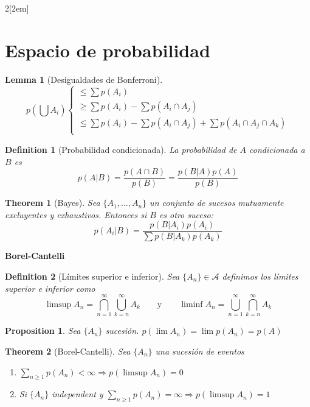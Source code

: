 \documentclass{myclass}
\newtheorem*{theorem}{Theorem}
\newtheorem*{lemma}{Lemma}
\newtheorem*{proposition}{Proposition}
\newtheorem*{definition}{Definition}
\begin{document}
\newpage
\begin{multicols}{2}[\columnsep2em]
\section{Espacio de probabilidad}
\begin{lemma}[Desigualdades de Bonferroni]
  \[
  p \left( \bigcup A_i \right)  \begin{cases}
    \le \sum p(A_i) \\
    \ge \sum p(A_i) - \sum p(A_i\cap A_j)\\
    \le \sum p(A_i) - \sum p(A_i\cap A_j) + \sum p(A_i\cap A_j\cap A_k)\\
  \end{cases}
  \] 
\end{lemma}

\begin{definition}[Probabilidad condicionada] La probabilidad de $A$ condicionada a  $B$ es
   \[
	   p(A|B) = \frac{p(A\cap B)}{p(B)} = \frac{p(B|A)p(A)}{p(B)}
  \] 
\end{definition}
\begin{theorem}[Bayes] Sea $\{A_1, \ldots, A_n\}$ un conjunto de sucesos mutuamente excluyentes y exhaustivos. Entonces si $B$ es otro suceso:
\[
 p(A_i|B) = \frac{p(B|A_i)p(A_i)}{\sum p(B|A_k)p(A_k)}
\] 
\end{theorem}

\textbf{Borel-Cantelli}

\begin{definition}[Límites superior e inferior] Sea $\{A_n\}\in \mathcal{A}$ definimos los límites superior e inferior como
  \[
  \limsup A_n =  \bigcap_{n=1}^\infty \bigcup_{k=n}^\infty A_k \qquad \text{y} \qquad 
  \liminf A_n =  \bigcup_{n=1}^\infty \bigcap_{k=n}^\infty A_k
  \] 
\end{definition}

\begin{proposition}
Sea $\{A_n\}$ sucesión.  $p(\lim A_n) = \lim p(A_n) = p(A)$ 
\end{proposition}
\begin{theorem}[Borel-Cantelli] Sea $\{A_n\}$ una sucesión de eventos
\begin{enumerate}[topsep=-6pt, itemsep=0pt]
  \item $\sum_{n\ge 1} p(A_n) < \infty \Rightarrow p(\limsup A_n) = 0 $ 
  \item Si $\{A_n\}$ independent y $\sum_{n\ge 1}p(A_n)=\infty \Rightarrow p(\limsup A_n)=1$
\end{enumerate}
\end{theorem}


\end{multicols}
\end{document}
